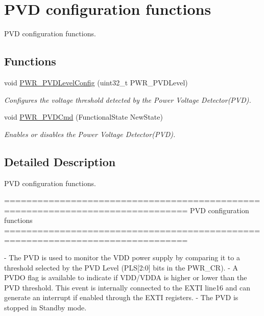 \hypertarget{group___p_w_r___group2}{\section{P\-V\-D configuration functions}
\label{group___p_w_r___group2}
}


P\-V\-D configuration functions.  


\subsection*{Functions}
\begin{DoxyCompactItemize}
\item 
void \hyperlink{group___p_w_r___group2_ga237c143ef6aa55abb8049fa7bf24ab8f}{P\-W\-R\-\_\-\-P\-V\-D\-Level\-Config} (uint32\-\_\-t P\-W\-R\-\_\-\-P\-V\-D\-Level)
\begin{DoxyCompactList}\small\item\em Configures the voltage threshold detected by the Power Voltage Detector(\-P\-V\-D). \end{DoxyCompactList}\item 
void \hyperlink{group___p_w_r___group2_ga42cad476b816e0a33594a933b3ed1acd}{P\-W\-R\-\_\-\-P\-V\-D\-Cmd} (Functional\-State New\-State)
\begin{DoxyCompactList}\small\item\em Enables or disables the Power Voltage Detector(\-P\-V\-D). \end{DoxyCompactList}\end{DoxyCompactItemize}


\subsection{Detailed Description}
P\-V\-D configuration functions. \begin{DoxyVerb} ===============================================================================
                           PVD configuration functions
 ===============================================================================  

 - The PVD is used to monitor the VDD power supply by comparing it to a threshold
   selected by the PVD Level (PLS[2:0] bits in the PWR_CR).
 - A PVDO flag is available to indicate if VDD/VDDA is higher or lower than the 
   PVD threshold. This event is internally connected to the EXTI line16
   and can generate an interrupt if enabled through the EXTI registers.
 - The PVD is stopped in Standby mode.\end{DoxyVerb}
 

